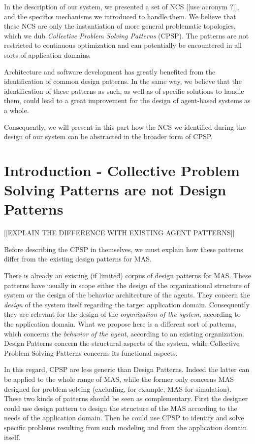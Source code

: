In the description of our system, we presented a set of NCS [[use acronym ?]], and the specifics mechanisms we introduced to handle them. We believe that these NCS are only the instantiation of more general problematic topologies, which we dub \emph{Collective Problem Solving Patterns} (CPSP). The patterns are not restricted to continuous optimization and can potentially be encountered in all sorts of application domains.

Architecture and software development has greatly benefited from the identification of common design patterns. In the same way, we believe that the identification of these patterns as such, as well as of specific solutions to handle them, could lead to a great improvement for the design of agent-based systems as a whole.

Consequently, we will present in this part how the NCS we identified during the design of our system can be abstracted in the broader form of CPSP.


\section{Introduction - Collective Problem Solving Patterns are not Design Patterns}

[[EXPLAIN THE DIFFERENCE WITH EXISTING AGENT PATTERNS]]

Before describing the CPSP in themselves, we must explain how these patterns differ from the existing design patterns for MAS.

There is already an existing (if limited) corpus of design patterns for MAS. These patterns have usually in scope either the design of the organizational structure of system or the design of the behavior architecture of the agents. They concern the \emph{design} of the system itself regarding the target application domain. Consequently they are relevant for the design of the \emph{organization of the system}, according to the application domain.
What we propose here is a different sort of patterns, which concerns the \emph{behavior of the agent}, according to an existing organization. Design Patterns concern the structural aspects of the system, while Collective Problem Solving Patterns concerns its functional aspects.

In this regard, CPSP are less generic than Design Patterns. Indeed the latter can be applied to the whole range of MAS, while the former only concerns MAS designed for problem solving (excluding, for example, MAS for simulation).\\
These two kinds of patterns should be seen as complementary.  First the designer could use design pattern to design the structure of the MAS according to the needs of the application domain. Then he could use CPSP to identify and solve specific problems resulting from such modeling and from the application domain itself.

